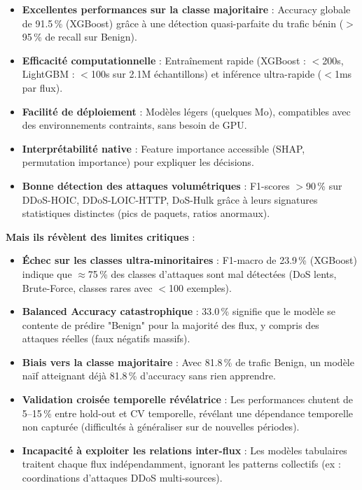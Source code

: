 ﻿\documentclass[11pt,a4paper]{article}
\begin{document}
\begin{itemize}
    \item \textbf{Excellentes performances sur la classe majoritaire} : Accuracy globale de 91.5\,\% (XGBoost) grâce à une détection quasi-parfaite du trafic bénin ($>$95\,\% de recall sur Benign).
    
    \item \textbf{Efficacité computationnelle} : Entraînement rapide (XGBoost : $<$200s, LightGBM : $<$100s sur 2.1M échantillons) et inférence ultra-rapide ($<$1ms par flux).
    
    \item \textbf{Facilité de déploiement} : Modèles légers (quelques Mo), compatibles avec des environnements contraints, sans besoin de GPU.
    
    \item \textbf{Interprétabilité native} : Feature importance accessible (SHAP, permutation importance) pour expliquer les décisions.
    
    \item \textbf{Bonne détection des attaques volumétriques} : F1-scores $>$90\,\% sur DDoS-HOIC, DDoS-LOIC-HTTP, DoS-Hulk grâce à leurs signatures statistiques distinctes (pics de paquets, ratios anormaux).
\end{itemize}

\textbf{Mais ils révèlent des limites critiques} :

\begin{itemize}
    \item \textbf{Échec sur les classes ultra-minoritaires} : F1-macro de 23.9\,\% (XGBoost) indique que $\approx$75\,\% des classes d'attaques sont mal détectées (DoS lents, Brute-Force, classes rares avec $<$100 exemples).
    
    \item \textbf{Balanced Accuracy catastrophique} : 33.0\,\% signifie que le modèle se contente de prédire "Benign" pour la majorité des flux, y compris des attaques réelles (faux négatifs massifs).
    
    \item \textbf{Biais vers la classe majoritaire} : Avec 81.8\,\% de trafic Benign, un modèle naïf atteignant déjà 81.8\,\% d'accuracy sans rien apprendre.
    
    \item \textbf{Validation croisée temporelle révélatrice} : Les performances chutent de 5--15\,\% entre hold-out et CV temporelle, révélant une dépendance temporelle non capturée (difficultés à généraliser sur de nouvelles périodes).
    
    \item \textbf{Incapacité à exploiter les relations inter-flux} : Les modèles tabulaires traitent chaque flux indépendamment, ignorant les patterns collectifs (ex : coordinations d'attaques DDoS multi-sources).
\end{itemize}
\end{document}
